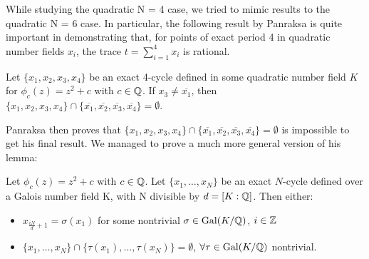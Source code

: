 While studying the quadratic N = 4 case, we tried to mimic results
to the quadratic N = 6 case. In particular, the following result by
Panraksa is quite important in demonstrating that, for points of exact
period 4 in quadratic number fields $x_i$, the trace $t = \sum\limits_
{i=1}^4 x_i$ is rational.

\begin{theorem} 
	Let $\{x_1, x_2, x_3, x_4\}$ be an exact 4-cycle defined in some
	quadratic number field $K$ for $\phi_c(z) = z^2 + c$ with $c \in \mathbb{Q}$.
	If $x_3 \neq \overline{x_1}$, then $\{x_1, x_2, x_3, x_4\} \cap 
	\{\overline{x_1}, \overline{x_2}, \overline{x_3}, \overline{x_4}\}
	= \emptyset$.
\end{theorem}

Panraksa then proves that $\{x_1, x_2, x_3, x_4\} \cap 
\{\overline{x_1}, \overline{x_2}, \overline{x_3}, \overline{x_4}\}
= \emptyset$ is impossible to get his final result. We managed to prove
a much more general version of his lemma:

\begin{theorem}
	Let $\phi_c(z) = z^2 + c$ with $c \in \mathbb{Q}$. Let $\{x_1, \ldots, x_{N}\}$ be
	an exact $N$-cycle defined over a Galois number field K, with N 
	divisible by	$d = [K:\mathbb{Q} ]$. Then either: \\
	\begin{itemize}
	\item $x_{\frac{iN}{d}+1} = \sigma(x_1)$ for some nontrivial $\sigma \in
	\mathrm{Gal}(K/\mathbb{Q})$, $i \in \mathbb{Z}$
	\item $\{x_1, \ldots, x_{N}\} \cap \{\tau(x_1), \ldots, \tau(x_{N})\} =
	\emptyset$, $\forall \tau \in \mathrm{Gal}(K/\mathbb{Q})$ nontrivial.
	\end{itemize}
\end{theorem}

